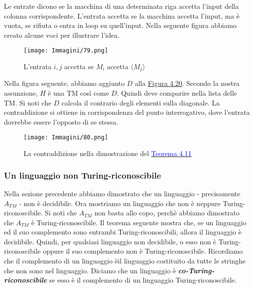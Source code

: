 \documentclass{article}
\begin{document}
Le entrate dicono se la macchina di una determinata riga accetta l'input della colonna corrispondente.
L'entrata accetta se la macchina accetta l'input, ma è vuota, se rifiuta o entra in loop su quell'input.
Nella seguente figura abbiamo creato alcune voci per illustrare l'idea.
\begin{figure}[H]
    \centering
    \texttt{[image: Immagini/79.png]}
    \caption{L'entrata $i,j$ accetta se $M_i$ accetta $\langle M_j \rangle$}
    \label{figura-4.20} 
\end{figure}
Nella figura seguente, abbiamo aggiunto $D$ alla \hyperref[figura-4.20]{Figura 4.20}.
Secondo la nostra assunzione, $H$ è una TM così come $D$.
Quindi deve comparire nella lista delle TM.
Si noti che $D$ calcola il contrario degli elementi sulla diagonale.
La contraddizione si ottiene in corrispondenza del punto interrogativo, dove l'entrata dovrebbe essere l'opposto di se stessa.
\begin{figure}[H]
    \centering
    \texttt{[image: Immagini/80.png]}
    \caption{La contraddizione nella dimostrazione del \hyperref[teorema-4.11]{\textcolor{blue}{Teorema 4.11}}}
    \label{figura-4.21}
\end{figure}
\newpage
\subsubsection{Un linguaggio non Turing-riconoscibile}
Nella sezione precedente abbiamo dimostrato che un linguaggio - precisamente $A_{TM}$ - non è decidibile.
Ora mostriamo un linguaggio che non è neppure Turing-riconoscibile.
Si noti che $A_{TM}$ non basta allo copo, perchè abbiamo dimostrato che $A_{TM}$ è Turing-riconoscibile.
Il teorema seguente mostra che, se un linguaggio ed il suo complemento sono entrambi Turing-riconoscibili, allora il linguaggio è decidibile.
Quindi, per qualsiasi linguaggio non decidibile, o esso non è Turing-riconoscibile oppure il suo complemento non è Turing-riconoscibile.
Ricordiamo che il complemento di un linguaggio èil linguaggio costituito da tutte le stringhe che non sono nel linguaggio.
Diciamo che un linguaggio è \textbf{\textit{co-Turing-riconoscibile}} se esso è il complemento di un linguaggio Turing-riconoscibile.
\end{document}
